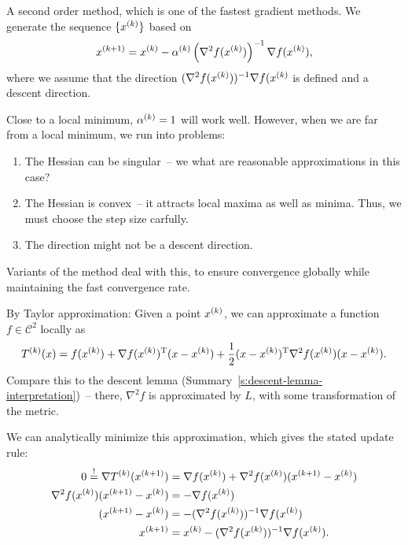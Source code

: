 \documentclass{article}
\begin{document}
A second order method, which is one of the fastest gradient methods.  We generate the sequence
\(\{\kth{x}\}\) based on
\begin{equation*}
  \kth[k+1]{x} = \kth{x} - \kth{\alpha}\left( \nabla^2 f(\kth{x}) \right)^{-1} \nabla f(\kth{x}),
\end{equation*}
where we assume that the direction \((\nabla^2 f(\kth{x}))^{-1} \nabla f(\kth{x}\) is
defined and a descent direction.

Close to a local minimum, \(\kth{\alpha} = 1\) will work well. However, when we are far from a local
minimum, we run into problems:
\begin{enumerate}
\item The Hessian can be singular~-- we what are reasonable approximations in this case?
\item The Hessian is convex~-- it attracts local maxima as well as minima.  Thus, we must choose the
  step size carfully.
\item The direction might not be a descent direction.
\end{enumerate}
Variants of the method deal with this, to ensure convergence globally while maintaining the fast
convergence rate.


\label{s:newton-method-derivation}

By Taylor approximation: Given a point \(\kth{x}\), we can approximate a function
\(f \in \mathcal{C}^2\) locally as
\begin{equation*}
  \kth{T}(x) = f(\kth{x}) + \T{\nabla f(\kth{x})}(x - \kth{x})
  + \frac{1}{2} \T{(x - \kth{x})} \nabla^2 f(\kth{x})(x - \kth{x}).
\end{equation*}
Compare this to the descent lemma (Summary~\ref{s:descent-lemma-interpretation})~-- there,
\(\nabla^2 f\) is approximated by \(L\), with some transformation of the metric.

We can analytically minimize this approximation, which gives the stated update rule:
\begin{align*}
  0 \overset{!}{=} \nabla \kth{T}(\kth[k+1]{x})
      &= \nabla f(\kth{x}) + \nabla^2 f(\kth{x})(\kth[k+1]{x} - \kth{x}) \\
  \nabla^2 f(\kth{x})(\kth[k+1]{x} - \kth{x}) &= -\nabla f(\kth{x}) \\
  (\kth[k+1]{x} - \kth{x}) &= -(\nabla^2 f(\kth{x}))^{-1} \nabla f(\kth{x}) \\
  \kth[k+1]{x} &= \kth{x} - (\nabla^2 f(\kth{x}))^{-1} \nabla f(\kth{x}).
\end{align*}
\end{document}
